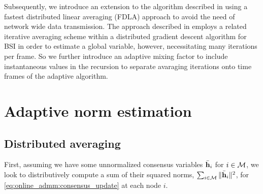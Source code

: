 \documentclass{article}
\begin{document}
Subsequently, we introduce an extension to the algorithm described in \cite{blochbergerDBSI} using a fastest distributed linear averaging (FDLA) approach \cite{xiaoFastLinearIterations2004} to avoid the need of network wide data transmission.
The approach described in \cite{yuDistributedBlindSystem2014,liuDistributedBlindIdentification2016} employs a related iterative averaging scheme within a distributed gradient descent algorithm for BSI in order to estimate a global variable, however, necessitating many iterations per frame.
So we further introduce an adaptive mixing factor to include instantaneous values in the recursion to separate avaraging iterations onto time frames of the adaptive algorithm.

\section{Adaptive norm estimation}
\label{sec:adaptivenormest}

\subsection[]{Distributed averaging}
First, assuming we have some unnormalized consensus variables \(\bar{\bm{\mathrm{h}}}_i\) for \(i \in \mathcal{M}\), we look to distributively compute a sum of their squared norms, \(\sum_{i \in \mathcal{M}} \|\bar{\bm{\mathrm{h}}}_i\|^2\), for \eqref{eq:online_admm:consensus_update} at each node \(i\).
\end{document}
